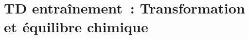 \documentclass[../../main/main.tex]{subfiles}
\begin{document}
\setcounter{chapter}{1}


\chapter{
  {TD entraînement~: Transformation et \'equilibre chimique}}

\resetQ


\resetQ


\resetQ


\resetQ

\end{document}

